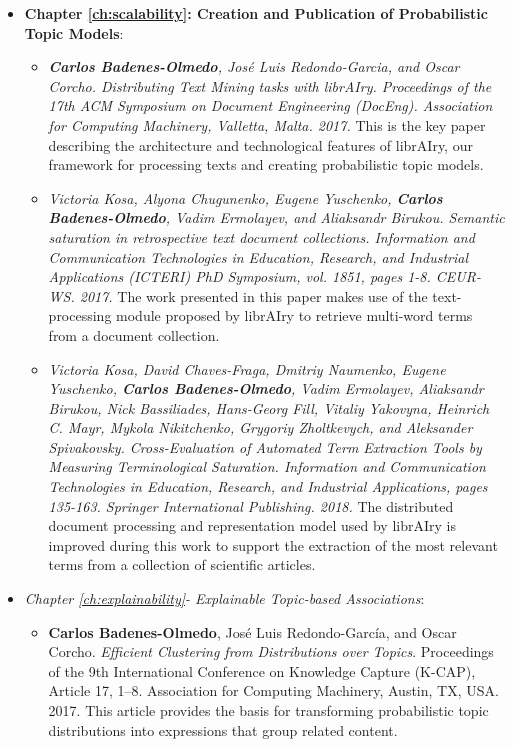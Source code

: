 \begin{itemize}
\item \textbf{Chapter \ref{ch:scalability}: Creation and Publication of Probabilistic Topic Models}:
\begin{itemize}
\item \textit{\textbf{Carlos Badenes-Olmedo}, José Luis Redondo-Garcia, and Oscar Corcho. \textit{Distributing Text Mining tasks with librAIry}. Proceedings of the 17th ACM Symposium on Document Engineering (DocEng). Association for Computing Machinery, Valletta, Malta. 2017.} This is the key paper describing the architecture and technological features of librAIry, our framework for processing texts and creating probabilistic topic models. 
\item \textit{Victoria Kosa, Alyona Chugunenko, Eugene Yuschenko, \textbf{Carlos Badenes-Olmedo}, Vadim Ermolayev, and Aliaksandr Birukou. \textit{Semantic saturation in retrospective text document collections}. Information and Communication Technologies in Education, Research, and Industrial Applications (ICTERI) PhD Symposium, vol. 1851, pages 1-8. CEUR-WS. 2017.} The work presented in this paper makes use of the text-processing module proposed by librAIry to retrieve multi-word terms from a document collection.
\item \textit{Victoria Kosa, David Chaves-Fraga, Dmitriy Naumenko, Eugene Yuschenko, \textbf{Carlos Badenes-Olmedo}, Vadim Ermolayev, Aliaksandr Birukou, Nick Bassiliades, Hans-Georg Fill, Vitaliy Yakovyna, Heinrich C. Mayr, Mykola Nikitchenko, Grygoriy Zholtkevych, and Aleksander Spivakovsky. \textit{Cross-Evaluation of Automated Term Extraction Tools by Measuring Terminological Saturation}. Information and Communication Technologies in Education, Research, and Industrial Applications, pages 135-163. Springer International Publishing. 2018.} The distributed document processing and representation model used by librAIry is improved during this work to support the extraction of the most relevant terms from a collection of scientific articles.
\end{itemize}
\item \textit{Chapter \ref{ch:explainability}- Explainable Topic-based Associations}:
\begin{itemize}
\item \textbf{Carlos Badenes-Olmedo}, José Luis Redondo-García, and Oscar Corcho. \textit{Efficient Clustering from Distributions over Topics}. Proceedings of the 9th International Conference on Knowledge Capture (K-CAP), Article 17, 1–8. Association for Computing Machinery, Austin, TX, USA. 2017. This article provides the basis for transforming probabilistic topic distributions into expressions that group related content. 

\end{itemize}
\end{itemize}
